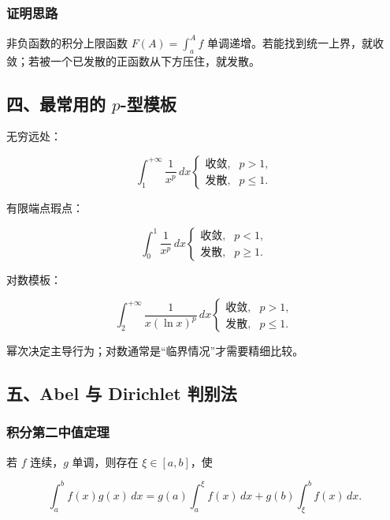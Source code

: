 \subsubsection*{证明思路}

非负函数的积分上限函数 \(F(A)=\int_a^A f\) 单调递增。若能找到统一上界，就收敛；若被一个已发散的正函数从下方压住，就发散。

\subsection*{四、最常用的 \(p\)-型模板}

无穷远处：

\[
      \int_1^{+\infty}\frac{1}{x^p}\,dx
      \begin{cases}
      \text{收敛},&p>1,\\
      \text{发散},&p\le1.
      \end{cases}
    \]

有限端点瑕点：

\[
      \int_0^1\frac{1}{x^p}\,dx
      \begin{cases}
      \text{收敛},&p<1,\\
      \text{发散},&p\ge1.
      \end{cases}
    \]

对数模板：

\[
      \int_2^{+\infty}\frac{1}{x(\ln x)^p}\,dx
      \begin{cases}
      \text{收敛},&p>1,\\
      \text{发散},&p\le1.
      \end{cases}
    \]

\begin{notebox}
幂次决定主导行为；对数通常是“临界情况”才需要精细比较。
\end{notebox}

\subsection*{五、Abel 与 Dirichlet 判别法}

\subsubsection*{积分第二中值定理}

若 \(f\) 连续，\(g\) 单调，则存在 \(\xi\in[a,b]\)，使

\[
      \int_a^b f(x)g(x)\,dx
      =
      g(a)\int_a^\xi f(x)\,dx
      +g(b)\int_\xi^b f(x)\,dx.
    \]

